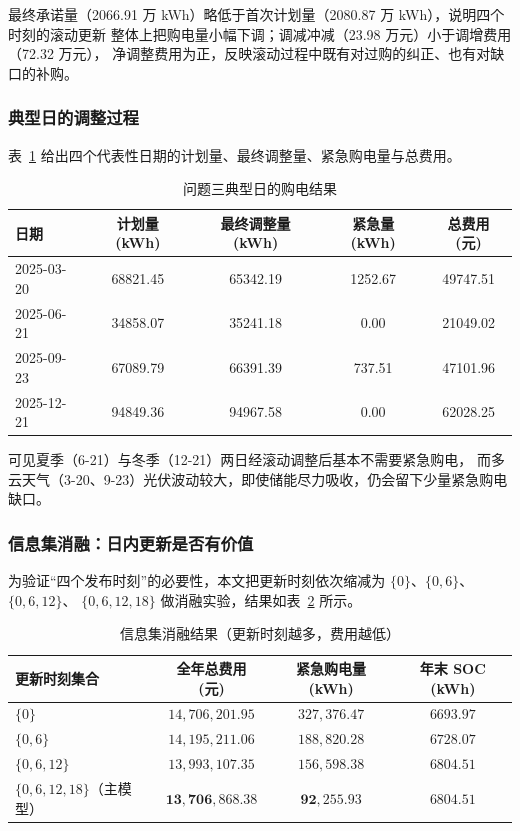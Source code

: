\documentclass[12pt,a4paper]{article}
\begin{document}
最终承诺量（2066.91 万 kWh）略低于首次计划量（2080.87 万 kWh），说明四个时刻的滚动更新
整体上把购电量小幅下调；调减冲减（23.98 万元）小于调增费用（72.32 万元），
净调整费用为正，反映滚动过程中既有对过购的纠正、也有对缺口的补购。

\subsubsection{典型日的调整过程}

表~\ref{tab:q3-days} 给出四个代表性日期的计划量、最终调整量、紧急购电量与总费用。

\begin{table}[htbp]
\centering
\caption{问题三典型日的购电结果}
\label{tab:q3-days}
\begin{tabular}{lcccc}
\toprule
\textbf{日期} & \textbf{计划量 (kWh)} & \textbf{最终调整量 (kWh)} & \textbf{紧急量 (kWh)} & \textbf{总费用 (元)} \\
\midrule
2025-03-20 & 68821.45 & 65342.19 & 1252.67 & 49747.51 \\
2025-06-21 & 34858.07 & 35241.18 & 0.00    & 21049.02 \\
2025-09-23 & 67089.79 & 66391.39 & 737.51  & 47101.96 \\
2025-12-21 & 94849.36 & 94967.58 & 0.00    & 62028.25 \\
\bottomrule
\end{tabular}
\end{table}

可见夏季（6-21）与冬季（12-21）两日经滚动调整后基本不需要紧急购电，
而多云天气（3-20、9-23）光伏波动较大，即使储能尽力吸收，仍会留下少量紧急购电缺口。

\subsubsection{信息集消融：日内更新是否有价值}

为验证“四个发布时刻”的必要性，本文把更新时刻依次缩减为 $\{0\}$、$\{0,6\}$、$\{0,6,12\}$、
$\{0,6,12,18\}$ 做消融实验，结果如表~\ref{tab:q3-ablation} 所示。

\begin{table}[htbp]
\centering
\caption{信息集消融结果（更新时刻越多，费用越低）}
\label{tab:q3-ablation}
\begin{tabular}{lccc}
\toprule
\textbf{更新时刻集合} & \textbf{全年总费用 (元)} & \textbf{紧急购电量 (kWh)} & \textbf{年末 SOC (kWh)} \\
\midrule
$\{0\}$                & $14{,}706{,}201.95$ & $327{,}376.47$ & $6693.97$ \\
$\{0,6\}$              & $14{,}195{,}211.06$ & $188{,}820.28$ & $6728.07$ \\
$\{0,6,12\}$           & $13{,}993{,}107.35$ & $156{,}598.38$ & $6804.51$ \\
$\{0,6,12,18\}$（主模型） & $\mathbf{13{,}706{,}868.38}$ & $\mathbf{92{,}255.93}$ & $6804.51$ \\
\bottomrule
\end{tabular}
\end{table}
\end{document}
